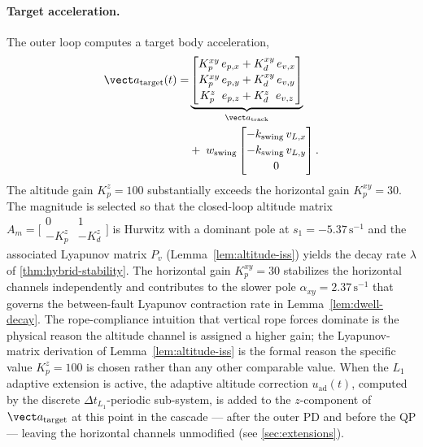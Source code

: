 \paragraph{Target acceleration.} The outer loop computes a target body acceleration,
\begin{align}
\label{eq:a-target}
  \vect a_{\mathrm{target}}(t)
    =& \underbrace{%
        \begin{bmatrix}
          K_p^{xy}\, e_{p,x} + K_d^{xy}\, e_{v,x} \\[2pt]
          K_p^{xy}\, e_{p,y} + K_d^{xy}\, e_{v,y} \\[2pt]
          K_p^{z}\;\; e_{p,z} + K_d^{z}\;\; e_{v,z}
        \end{bmatrix}}_{\vect a_{\mathrm{track}}}\\
    &+\; w_{\mathrm{swing}}
      \begin{bmatrix}
        -k_{\mathrm{swing}}\, v_{L,x} \\[2pt]
        -k_{\mathrm{swing}}\, v_{L,y} \\[2pt]
        0
      \end{bmatrix}.\nonumber
\end{align}
The altitude gain $K_p^z = 100$ substantially exceeds the horizontal gain $K_p^{xy} = 30$. The magnitude is selected so that the closed-loop altitude matrix $A_m = \bigl[\begin{smallmatrix} 0 & 1 \\ -K_p^z & -K_d^z \end{smallmatrix}\bigr]$ is Hurwitz with a dominant pole at $s_1 = -5.37\,\mathrm{s}^{-1}$ and the associated Lyapunov matrix $P_v$ (Lemma~\ref{lem:altitude-iss}) yields the decay rate $\lambda$ of \cref{thm:hybrid-stability}. The horizontal gain $K_p^{xy} = 30$ stabilizes the horizontal channels independently and contributes to the slower pole $\alpha_{xy} = 2.37\,\mathrm{s}^{-1}$ that governs the between-fault Lyapunov contraction rate in Lemma~\ref{lem:dwell-decay}. The rope-compliance intuition that vertical rope forces dominate is the physical reason the altitude channel is assigned a higher gain; the Lyapunov-matrix derivation of Lemma~\ref{lem:altitude-iss} is the formal reason the specific value $K_p^z = 100$ is chosen rather than any other comparable value. When the $L_1$ adaptive extension is active, the adaptive altitude correction $u_{\mathrm{ad}}(t)$, computed by the discrete $\Delta t_{L_1}$-periodic sub-system, is added to the $z$-component of $\vect a_{\mathrm{target}}$ at this point in the cascade --- after the outer PD and before the QP --- leaving the horizontal channels unmodified (see \cref{sec:extensions}).

